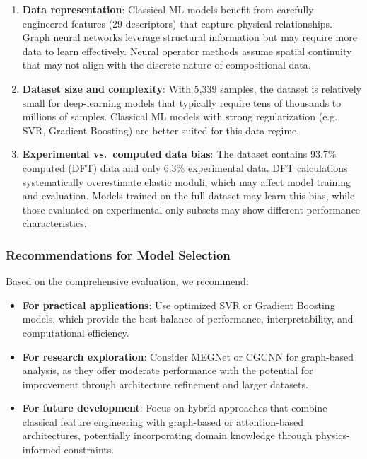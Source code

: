 \documentclass[11pt,a4paper]{article}
\begin{document}
\begin{enumerate}
  \item \textbf{Data representation}: Classical ML models benefit from carefully engineered features (29 descriptors) that capture physical relationships. Graph neural networks leverage structural information but may require more data to learn effectively. Neural operator methods assume spatial continuity that may not align with the discrete nature of compositional data.
  
  \item \textbf{Dataset size and complexity}: With 5{,}339 samples, the dataset is relatively small for deep-learning models that typically require tens of thousands to millions of samples. Classical ML models with strong regularization (e.g., SVR, Gradient Boosting) are better suited for this data regime.
  
  \item \textbf{Experimental vs.\ computed data bias}: The dataset contains 93.7\% computed (DFT) data and only 6.3\% experimental data. DFT calculations systematically overestimate elastic moduli, which may affect model training and evaluation. Models trained on the full dataset may learn this bias, while those evaluated on experimental-only subsets may show different performance characteristics.
\end{enumerate}

\subsubsection{Recommendations for Model Selection}

Based on the comprehensive evaluation, we recommend:

\begin{itemize}
  \item \textbf{For practical applications}: Use optimized SVR or Gradient Boosting models, which provide the best balance of performance, interpretability, and computational efficiency.
  
  \item \textbf{For research exploration}: Consider MEGNet or CGCNN for graph-based analysis, as they offer moderate performance with the potential for improvement through architecture refinement and larger datasets.
  
  \item \textbf{For future development}: Focus on hybrid approaches that combine classical feature engineering with graph-based or attention-based architectures, potentially incorporating domain knowledge through physics-informed constraints.
\end{itemize}
\end{document}
